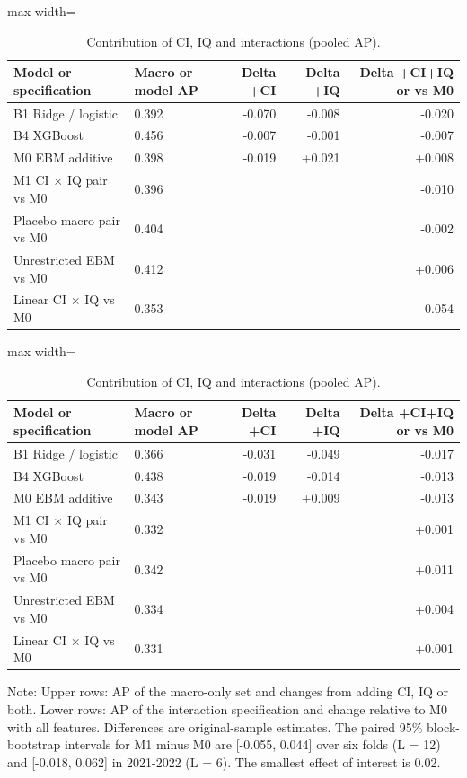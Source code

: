 \documentclass[preprint,12pt,authoryear]{elsarticle}
\begin{document}
\begin{table}[!htbp]
\centering
\scriptsize
\setlength{\tabcolsep}{3pt}
\caption{Contribution of CI, IQ and interactions (pooled AP).}
\label{tab:ablation}
\par{}\par\smallskip
\begin{adjustbox}{max width=\textwidth}
\begin{tabular}{llrrr}
\toprule
Model or specification & Macro or model AP & Delta +CI & Delta +IQ & Delta +CI+IQ or vs M0 \\
\midrule
B1 Ridge / logistic & 0.392 & -0.070 & -0.008 & -0.020 \\
B4 XGBoost & 0.456 & -0.007 & -0.001 & -0.007 \\
M0 EBM additive & 0.398 & -0.019 & +0.021 & +0.008 \\
M1 CI $\times$ IQ pair vs M0 & 0.396 &  &  & -0.010 \\
Placebo macro pair vs M0 & 0.404 &  &  & -0.002 \\
Unrestricted EBM vs M0 & 0.412 &  &  & +0.006 \\
Linear CI $\times$ IQ vs M0 & 0.353 &  &  & -0.054 \\
\bottomrule
\end{tabular}
\end{adjustbox}
\par{}\par\smallskip
\begin{adjustbox}{max width=\textwidth}
\begin{tabular}{llrrr}
\toprule
Model or specification & Macro or model AP & Delta +CI & Delta +IQ & Delta +CI+IQ or vs M0 \\
\midrule
B1 Ridge / logistic & 0.366 & -0.031 & -0.049 & -0.017 \\
B4 XGBoost & 0.438 & -0.019 & -0.014 & -0.013 \\
M0 EBM additive & 0.343 & -0.019 & +0.009 & -0.013 \\
M1 CI $\times$ IQ pair vs M0 & 0.332 &  &  & +0.001 \\
Placebo macro pair vs M0 & 0.342 &  &  & +0.011 \\
Unrestricted EBM vs M0 & 0.334 &  &  & +0.004 \\
Linear CI $\times$ IQ vs M0 & 0.331 &  &  & +0.001 \\
\bottomrule
\end{tabular}
\end{adjustbox}
\par\vspace{2pt}\parbox{0.95\linewidth}{\scriptsize Note: Upper rows: AP of the macro-only set and changes from adding CI, IQ or both. Lower rows: AP of the interaction specification and change relative to M0 with all features. Differences are original-sample estimates. The paired 95\% block-bootstrap intervals for M1 minus M0 are [-0.055, 0.044] over six folds (L = 12) and [-0.018, 0.062] in 2021-2022 (L = 6). The smallest effect of interest is 0.02.}
\end{table}
\end{document}
